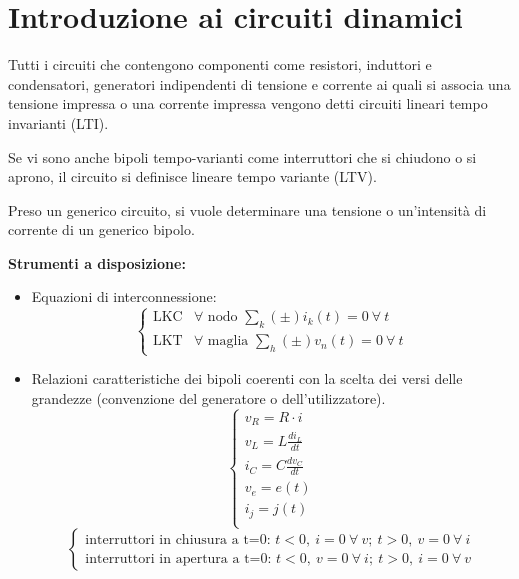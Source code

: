 \section{Introduzione ai circuiti dinamici}
Tutti i circuiti che contengono componenti come
resistori, induttori e condensatori, generatori indipendenti di tensione e corrente ai quali si associa 
una tensione impressa o una corrente impressa vengono detti circuiti lineari tempo invarianti (LTI).

Se vi sono anche bipoli tempo-varianti come interruttori che si chiudono o si aprono, il circuito
si definisce lineare tempo variante (LTV).

Preso un generico circuito, si vuole determinare una tensione o un'intensità di corrente di un generico
bipolo.

\textbf{Strumenti a disposizione:}

\begin{itemize}
\item Equazioni di interconnessione:
\begin{equation} \label{eq:leggi_kirchooff}
\begin{cases}
        \text{LKC} & \forall \text{ nodo } \sum_{k} (\pm) i_k(t) = 0\ \forall\ t \\
        \text{LKT} & \forall \text{ maglia } \sum_{h} (\pm) v_n(t) = 0\ \forall\ t
\end{cases}
\end{equation}

\item Relazioni caratteristiche dei bipoli coerenti con la scelta dei versi delle grandezze (convenzione del generatore o dell'utilizzatore).
\begin{equation}
\begin{cases}
v_R  = R\cdot i \\
v_L  = L\frac{di_L}{dt} \\
i_C  = C\frac{dv_C}{dt} \\
v_e  = e(t)\\
i_j  = j(t) \\
\end{cases}
\end{equation}
\begin{equation*}
\begin{cases}
\text{interruttori in chiusura a t=0: }  {t<0,\ i = 0\ \forall\ v;\ t > 0,\ v = 0\ \forall\ i} \\
\text{interruttori in apertura a t=0: }  {t<0,\ v = 0\ \forall\ i;\ t > 0,\ i = 0\ \forall\ v} 
\end{cases}
\end{equation*}
\end{itemize}

